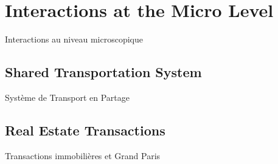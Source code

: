 




\chapter{Interactions at the Micro Level}{Interactions au niveau microscopique} %

\label{ch:micro} %



\headercit{}{}{}


\bigskip

























\section{Shared Transportation System}{Système de Transport en Partage}












\newpage



\section{Real Estate Transactions}{Transactions immobilières et Grand Paris}




